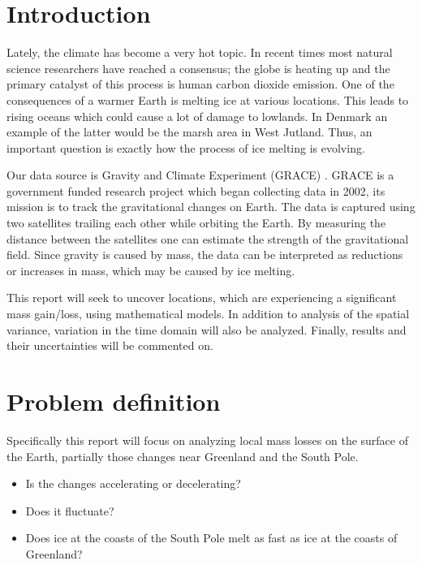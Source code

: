 \section{Introduction}
Lately, the climate has become a very hot topic. 
In recent times most natural science researchers have reached a consensus;
the globe is heating up and the primary catalyst of this process is human carbon dioxide emission.
One of the consequences of a warmer Earth is melting ice at various locations.
This leads to rising oceans which could cause a lot of damage to lowlands.
In Denmark an example of the latter would be the marsh area in West Jutland.
Thus, an important question is exactly how the process of ice melting is evolving.

Our data source is Gravity and Climate Experiment (GRACE) \cite{GRACE-data-source}. 
GRACE is a government funded research project which began collecting data in 2002, its mission is to track the gravitational changes on Earth.
The data is captured using two satellites trailing each other while orbiting the Earth.
By measuring the distance between the satellites one can estimate the strength of the gravitational field.
Since gravity is caused by mass, the data can be interpreted as reductions or increases in mass, which may be caused by ice melting.

This report will seek to uncover locations, which are experiencing a significant mass gain/loss, using mathematical models. 
In addition to analysis of the spatial variance, variation in the time domain will also be analyzed.
Finally, results and their uncertainties will be commented on.

\section{Problem definition}
Specifically this report will focus on analyzing local mass losses on the surface of the Earth, partially those changes near Greenland and the South Pole.

\begin{itemize}
\item Is the changes accelerating or decelerating?
\item Does it fluctuate?
\item Does ice at the coasts of the South Pole melt as fast as ice at the coasts of Greenland?
\end{itemize}

